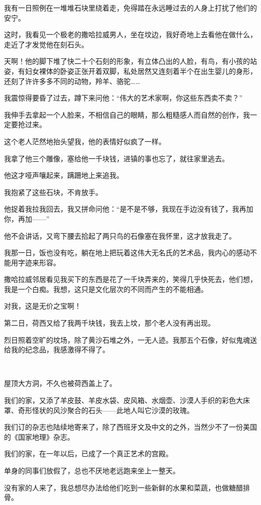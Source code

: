 \par 我有一日照例在一堆堆石块里绕着走，免得踏在永远睡过去的人身上打扰了他们的安宁。
\par 这时，我看见一个极老的撒哈拉威男人，坐在坟边，我好奇地上去看他在做什么，走近了才发觉他在刻石头。
\par 天啊！他的脚下堆了快二十个石刻的形象，有立体凸出的人脸，有鸟，有小孩的站姿，有妇女裸体的卧姿正张开着双脚，私处居然又连刻着半个在出生婴儿的身形，还刻了许许多多不同的动物，羚羊、骆驼……
\par 我震惊得要昏了过去，蹲下来问他：“伟大的艺术家啊，你这些东西卖不卖？”
\par 我伸手去拿起一个人脸来，不相信自己的眼睛，那么粗糙感人而自然的创作，我一定要抢过来。
\par 这个老人茫然地抬头望我，他的表情好似疯了一样。
\par 我拿了他三个雕像，塞给他一千块钱，进镇的事也忘了，就往家里逃去。
\par 他这才哑声嚷起来，蹒跚地上来追我。
\par 我抱紧了这些石块，不肯放手。
\par 他捉着我拉我回去，我又拼命问他：“是不是不够，我现在手边没有钱了，我再加你，再加——”
\par 他不会讲话，又弯下腰去拾起了两只鸟的石像塞在我怀里，这才放我走了。
\par 我那一日，饭也没有吃，躺在地上把玩着这伟大无名氏的艺术品，我内心的感动不能用字迹来形容。
\par 撒哈拉威邻居看见我买下的东西是花了一千块弄来的，笑得几乎快死去，他们想，我是一个白痴。我想，这只是文化层次的不同而产生的不能相通。
\par 对我，这是无价之宝啊！
\par 第二日，荷西又给了我两千块钱，我去上坟，那个老人没有再出现。
\par 烈日照着空旷的坟场，除了黄沙石堆之外，一无人迹。我那五个石像，好似鬼魂送给我的纪念品，我感激得不得了。
\par  
\par 屋顶大方洞，不久也被荷西盖上了。
\par 我们的家，又添了羊皮鼓、羊皮水袋、皮风箱、水烟壶、沙漠人手织的彩色大床罩、奇形怪状的风沙聚合的石头——此地人叫它沙漠的玫瑰。
\par 我们订的杂志也陆续地寄来了，除了西班牙文及中文的之外，当然少不了一份美国的《国家地理》杂志。
\par 我们的家，在一年以后，已成了一个真正艺术的宫殿。
\par 单身的同事们放假了，总也不厌地老远跑来坐上一整天。
\par 没有家的人来了，我总想尽办法给他们吃到一些新鲜的水果和菜蔬，也做糖醋排骨。
